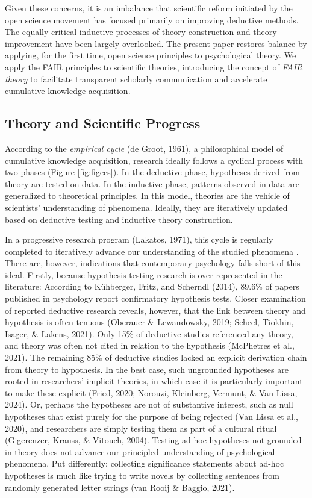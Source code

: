 \documentclass[
  man,floatsintext]{apa6}
\begin{document}
Given these concerns, it is an imbalance that scientific reform initiated by the open science movement has focused primarily on improving deductive methods.
The equally critical inductive processes of theory construction and theory improvement have been largely overlooked.
The present paper restores balance by applying, for the first time,
open science principles to psychological theory.
We apply the FAIR principles to scientific theories,
introducing the concept of \emph{FAIR theory} to
facilitate transparent scholarly communication and accelerate cumulative knowledge acquisition.

\subsection{Theory and Scientific Progress}\label{theory-and-scientific-progress}

According to the \emph{empirical cycle} (de Groot, 1961),
a philosophical model of cumulative knowledge acquisition,
research ideally follows a cyclical process with two phases (Figure \ref{fig:figecs}).
In the deductive phase, hypotheses derived from theory are tested on data. In the inductive phase, patterns observed in data are generalized to theoretical principles.
In this model, theories are the vehicle of scientists' understanding of phenomena.
Ideally, they are iteratively updated based on deductive testing and inductive theory construction.

In a progressive research program (Lakatos, 1971),
this cycle is regularly completed to iteratively advance our understanding of the studied phenomena
.
There are, however, indications that contemporary psychology falls short of this ideal.
Firstly, because hypothesis-testing research is over-represented in the literature:
According to Kühberger, Fritz, and Scherndl (2014), 89.6\% of papers published in psychology report confirmatory hypothesis tests.
Closer examination of reported deductive research reveals, however, that the link between theory and hypothesis is often tenuous (Oberauer \& Lewandowsky, 2019; Scheel, Tiokhin, Isager, \& Lakens, 2021).
Only 15\% of deductive studies referenced any theory, and theory was often not cited in relation to the hypothesis (McPhetres et al., 2021).
The remaining 85\% of deductive studies lacked an explicit derivation chain from theory to hypothesis.
In the best case, such ungrounded hypotheses are rooted in researchers' implicit theories, in which case it is particularly important to make these explicit (Fried, 2020; Norouzi, Kleinberg, Vermunt, \& Van Lissa, 2024).
Or, perhaps the hypotheses are not of substantive interest, such as null hypotheses that exist purely for the purpose of being rejected (Van Lissa et al., 2020), and researchers are simply testing them as part of a cultural ritual (Gigerenzer, Krauss, \& Vitouch, 2004).
Testing ad-hoc hypotheses not grounded in theory does not advance our principled understanding of psychological phenomena.
Put differently: collecting significance statements about ad-hoc hypotheses is much like trying to write novels by collecting sentences from randomly generated letter strings (van Rooij \& Baggio, 2021).
\end{document}
